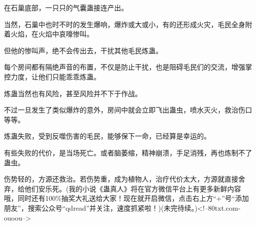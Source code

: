 \begin{this_body}
在石巢底部，一只只的气囊蛊接连产出。

当然，石巢中也时不时的发生爆响，爆炸或大或小，有的还形成火灾，毛民全身附着火焰，在火焰中哀嚎惨叫。

但他的惨叫声，绝不会传出去，干扰其他毛民炼蛊。

每个房间都有隔绝声音的布置，不仅是防止干扰，也是阻碍毛民们的交流，增强掌控力度，让他们只能乖乖炼蛊。

炼蛊当然也有风险，甚至风险并不下于作战。

不过一旦发生了类似爆炸的意外，房间中就会立即飞出蛊虫，喷水灭火，救治伤口等等。

炼蛊失败，受到反噬伤害的毛民，能够保下一命，已经算是幸运的。

有些失败的代价，是当场死亡。或者脑萎缩，精神崩溃，手足消残，再也炼制不了蛊虫。

伤势轻的，方源还救治。若伤势重，成为植物人，治疗代价太大，方源就直接舍弃，给他们安乐死。(我的小说《蛊真人》将在官方微信平台上有更多新鲜内容哦，同时还有100\%抽奖大礼送给大家！现在就开启微信，点击右上方“+”号“添加朋友”，搜索公众号“qdread”并关注，速度抓紧啦！)(未完待续。)<!--80txt.com-ouoou-->

\end{this_body}

